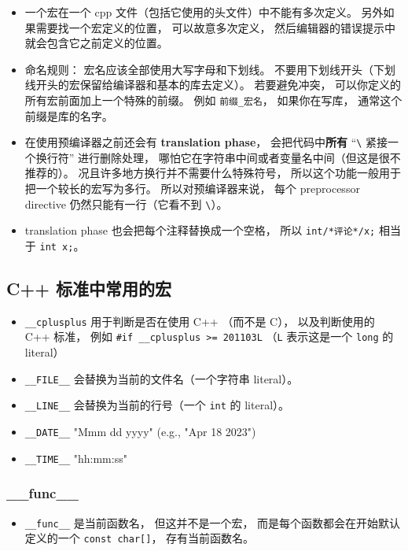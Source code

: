 \begin{itemize}
\item 一个宏在一个 cpp 文件（包括它使用的头文件）中不能有多次定义。 另外如果需要找一个宏定义的位置， 可以故意多次定义， 然后编辑器的错误提示中就会包含它之前定义的位置。
\item 命名规则： 宏名应该全部使用大写字母和下划线。 不要用下划线开头（下划线开头的宏保留给编译器和基本的库去定义）。 若要避免冲突， 可以你定义的所有宏前面加上一个特殊的前缀。 例如 \verb|前缀_宏名|， 如果你在写库， 通常这个前缀是库的名字。
\item 在使用预编译器之前还会有 \textbf{translation phase}， 会把代码中\textbf{所有} “\verb|\| 紧接一个换行符” 进行删除处理， 哪怕它在字符串中间或者变量名中间（但这是很不推荐的）。 况且许多地方换行并不需要什么特殊符号， 所以这个功能一般用于把一个较长的宏写为多行。 所以对预编译器来说， 每个 preprocessor directive 仍然只能有一行（它看不到 \verb|\|）。
\item translation phase 也会把每个注释替换成一个空格， 所以 \verb|int/*评论*/x;| 相当于 \verb|int x;|。
\end{itemize}

\subsection{C++ 标准中常用的宏}
\begin{itemize}
\item \verb|__cplusplus| 用于判断是否在使用 C++ （而不是 C）， 以及判断使用的 C++ 标准， 例如 \verb|#if __cplusplus >= 201103L| （\verb|L| 表示这是一个 \verb|long| 的 literal）
\item \verb|__FILE__| 会替换为当前的文件名（一个字符串 literal）。
\item \verb|__LINE__| 会替换为当前的行号（一个 \verb|int| 的 literal）。
\item \verb|__DATE__| "Mmm dd yyyy" (e.g., "Apr 18 2023")
\item \verb|__TIME__| "hh:mm:ss"
\end{itemize}

\subsubsection{__func__}
\begin{itemize}
\item \verb|__func__| 是当前函数名， 但这并不是一个宏， 而是每个函数都会在开始默认定义的一个 \verb|const char[]|， 存有当前函数名。
\end{itemize}


